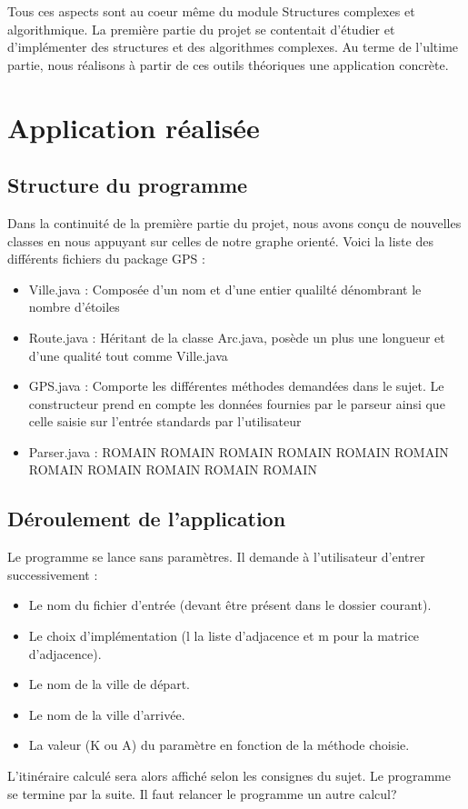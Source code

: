Tous ces aspects sont au coeur même du module Structures complexes et algorithmique. La première partie du projet se contentait d'étudier et d'implémenter des structures et des algorithmes complexes. Au terme de l'ultime partie, nous réalisons à partir de ces outils  théoriques une application concrète.

\clearpage

\section{Application réalisée}

\subsection{Structure du programme}
Dans la continuité de la première partie du projet, nous avons conçu de nouvelles classes en nous appuyant sur celles de notre graphe orienté. Voici la liste des différents fichiers du package GPS : 

\begin{itemize}
\item
Ville.java : Composée d'un nom et d'une entier qualilté dénombrant le nombre d'étoiles
\item
Route.java : Héritant de la classe Arc.java, posède un plus une longueur  et d'une qualité tout comme Ville.java
\item
GPS.java : Comporte les différentes méthodes demandées dans le sujet. Le constructeur prend en compte les données fournies par le parseur ainsi que celle saisie sur l'entrée standards par l'utilisateur
\item
Parser.java : ROMAIN ROMAIN ROMAIN ROMAIN ROMAIN ROMAIN ROMAIN ROMAIN ROMAIN ROMAIN ROMAIN
\end{itemize}


\subsection{Déroulement de l'application}
Le programme se lance sans paramètres. Il demande à l'utilisateur d'entrer successivement : 
\begin{itemize}
\item
Le nom du fichier d'entrée (devant être présent dans le dossier courant).
\item
Le choix d'implémentation (l la liste d'adjacence et m pour la matrice d'adjacence).
\item
Le nom de la ville de départ.
\item
Le nom de la ville d'arrivée.
\item 
La valeur (K ou A) du paramètre en fonction de la méthode choisie.
\end{itemize}
L'itinéraire calculé sera alors affiché selon les consignes du sujet. Le programme se termine par la suite. Il faut relancer le programme un autre calcul?
 

